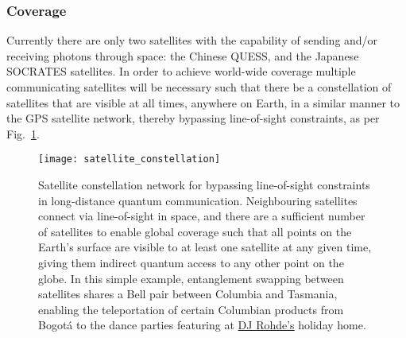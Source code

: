 %
%

\subsubsection{Coverage}

Currently there are only two satellites with the capability of sending and/or receiving photons through space: the Chinese QUESS, and the Japanese SOCRATES satellites. In order to achieve world-wide coverage multiple communicating satellites will be necessary such that there be a constellation of satellites that are visible at all times, anywhere on Earth, in a similar manner to the GPS satellite network, thereby bypassing line-of-sight constraints, as per Fig.~\ref{fig:sat_constellation}.

\begin{figure}[!htbp]
	\texttt{[image: satellite\_constellation]}
	\captionspacefig \caption{Satellite constellation network for bypassing line-of-sight constraints in long-distance quantum communication. Neighbouring satellites connect via line-of-sight in space, and there are a sufficient number of satellites to enable global coverage such that all points on the Earth's surface are visible to at least one satellite at any given time, giving them indirect quantum access to any other point on the globe. In this simple example, entanglement swapping between satellites shares a Bell pair between Columbia and Tasmania, enabling the teleportation of certain Columbian products from Bogot{\'a} to the dance parties featuring at \href{https://soundcloud.com/peter-rohde}{DJ Rohde's} holiday home.} \label{fig:sat_constellation}
\end{figure}


